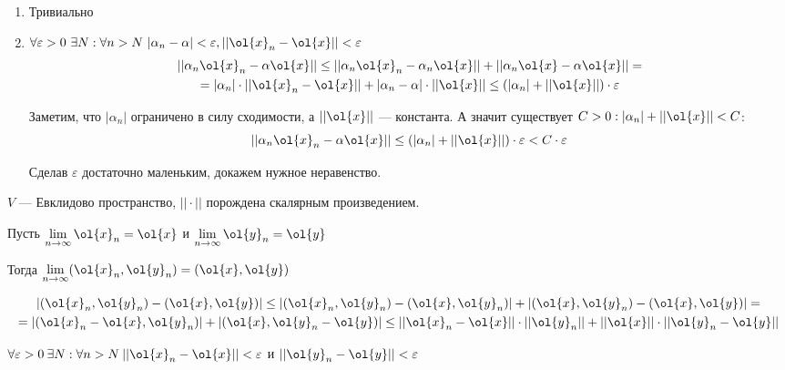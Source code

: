 \begin{enumerate}
    \item
        Тривиально
    \item
        \(
            \forall \varepsilon > 0 \ \exists N : \forall n > N \
            |\alpha_n - \alpha| < \varepsilon, || \ol{x}_n - \ol{x} || < \varepsilon
        \)
        \begin{gather*}
            || \alpha_n \ol{x}_n - \alpha \ol{x} ||
            \leq
            || \alpha_n \ol{x}_n - \alpha_n \ol{x} || + || \alpha_n \ol{x} - \alpha \ol{x} ||
            =
            \\
            =
            | \alpha_n | \cdot || \ol{x}_n - \ol{x} || + |\alpha_n - \alpha| \cdot || \ol{x} ||
            \leq
            (| \alpha_n | + || \ol{x} ||) \cdot \varepsilon
        \end{gather*}

        Заметим, что \( |\alpha_n| \) ограничено в силу сходимости, а \( || \ol{x} || \) --- константа.
        А значит существует \( C > 0 : | \alpha_n | + || \ol{x} || < C \):
        \[
            || \alpha_n \ol{x}_n - \alpha \ol{x} ||
            \leq
            (| \alpha_n | + || \ol{x} ||) \cdot \varepsilon
            <
            C \cdot \varepsilon
        \]

        Сделав \( \varepsilon \) достаточно маленьким, докажем нужное неравенство.
\end{enumerate}

\begin{thrm}{}{}
    \( V \) --- Евклидово пространство, \( || \cdot || \) порождена скалярным произведением.

    Пусть \( \lim\limits_{n \to \infty} \ol{x}_n = \ol{x} \) и \( \lim\limits_{n \to \infty} \ol{y}_n = \ol{y} \)

    Тогда \( \lim\limits_{n \to \infty} (\ol{x}_n, \ol{y}_n) = (\ol{x}, \ol{y}) \)
\end{thrm}
\begin{gather*}
    | (\ol{x}_n, \ol{y}_n) - (\ol{x}, \ol{y}) |
    \leq
    | (\ol{x}_n, \ol{y}_n) - (\ol{x}, \ol{y}_n)| + | (\ol{x}, \ol{y}_n) - (\ol{x}, \ol{y}) |
    =
    \\
    =
    | (\ol{x}_n - \ol{x}, \ol{y}_n) | + | (\ol{x}, \ol{y}_n - \ol{y}) |
    \leq
    || \ol{x}_n - \ol{x} || \cdot || \ol{y}_n || + || \ol{x} || \cdot || \ol{y}_n - \ol{y} ||
\end{gather*}

\( \forall \varepsilon > 0 \: \exists N : \forall n > N \: || \ol{x}_n - \ol{x} || < \varepsilon \)
и \( || \ol{y}_n - \ol{y} || < \varepsilon \)

